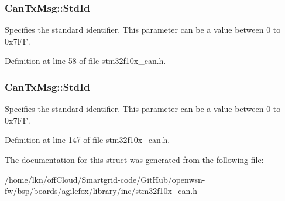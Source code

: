 \subsubsection[{\texorpdfstring{Std\+Id}{StdId}}]{ Can\+Tx\+Msg\+::\+Std\+Id}\hypertarget{struct_can_tx_msg_ade3f168458a60e14e912b863e84c6dcb}{}\label{struct_can_tx_msg_ade3f168458a60e14e912b863e84c6dcb}
Specifies the standard identifier. This parameter can be a value between 0 to 0x7\+FF. 

Definition at line 58 of file stm32f10x\+\_\+can.\+h.

\subsubsection[{\texorpdfstring{Std\+Id}{StdId}}]{ Can\+Tx\+Msg\+::\+Std\+Id}\hypertarget{struct_can_tx_msg_abfb50c8208227f8cf378f29cf9a3a6f3}{}\label{struct_can_tx_msg_abfb50c8208227f8cf378f29cf9a3a6f3}
Specifies the standard identifier. This parameter can be a value between 0 to 0x7\+FF. 

Definition at line 147 of file stm32f10x\+\_\+can.\+h.



The documentation for this struct was generated from the following file\+:\begin{DoxyCompactItemize}
\item 
/home/lkn/off\+Cloud/\+Smartgrid-\/code/\+Git\+Hub/openwsn-\/fw/bsp/boards/agilefox/library/inc/\hyperlink{agilefox_2library_2inc_2stm32f10x__can_8h}{stm32f10x\+\_\+can.\+h}\end{DoxyCompactItemize}
